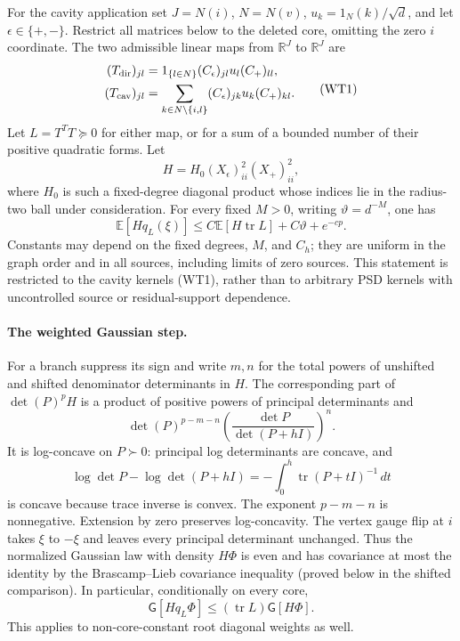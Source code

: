 \documentclass[10pt]{article}
\numberwithin{equation}{section}
\newcommand{\1}{\mathbf1}
\begin{document}
For the cavity application set $J=N(i)$, $N=N(v)$,
$u_k=1_N(k)/\sqrt d$, and let $\epsilon\in\{+,-\}$.  Restrict all
matrices below to the deleted core, omitting the zero $i$ coordinate.
The two admissible linear maps from $\mathbb R^J$ to $\mathbb R^J$ are
\[
 \begin{split}
 (T_{\rm dir})_{jl}
   &=1_{\{l\in N\}}(C_\epsilon)_{jl}u_l(C_+)_{ll},\\
 (T_{\rm cav})_{jl}
   &=\sum_{k\in N\setminus\{i,l\}}
               (C_\epsilon)_{jk}u_k(C_+)_{kl}.
 \end{split}                                                    \tag{WT1}
\]
Let $L=T^TT\succeq0$ for either map, or for a sum of a bounded number
of their positive quadratic forms.  Let
\[
 H=H_0(X_\epsilon)_{ii}^2(X_+)_{ii}^2,
\]
where $H_0$ is such a fixed-degree diagonal product whose indices
lie in the radius-two ball under consideration.
For every fixed $M>0$, writing $\vartheta=d^{-M}$, one has
\[
 \boxed{\quad
 \mathbb E[Hq_L(\xi)]\le C\mathbb E[H\operatorname{tr}L]
                                  +C\vartheta+e^{-cp}.
 \quad}                                                         \tag{WT2}
\]
Constants may depend on the fixed degrees, $M$, and $C_h$; they are
uniform in the graph order and in all sources, including limits of
zero sources.  This statement is restricted to the cavity kernels
(WT1), rather than to arbitrary PSD kernels with uncontrolled source
or residual-support dependence.

\paragraph{The weighted Gaussian step.}
For a branch suppress its sign and write $m,n$ for the total powers
of unshifted and shifted denominator determinants in $H$.  The
corresponding part of $\det(P)^pH$ is a product of positive powers of
principal determinants and
\[
 \det(P)^{p-m-n}
            \left(\frac{\det P}{\det(P+hI)}\right)^n.
\]
It is log-concave on $P\succ0$: principal log determinants are
concave, and
\[
 \log\det P-\log\det(P+hI)
       =-\int_0^h\operatorname{tr}(P+tI)^{-1}\,dt
\]
is concave because trace inverse is convex.  The exponent $p-m-n$
is nonnegative.  Extension by zero preserves log-concavity.  The
vertex gauge flip at $i$ takes $\xi$ to $-\xi$ and leaves every
principal determinant unchanged.  Thus the normalized Gaussian law
with density $H\Phi$ is even and has covariance at most the identity
by the Brascamp--Lieb covariance inequality (proved below in the
shifted comparison).  In particular, conditionally on every core,
\[
 \mathsf G[Hq_L\Phi]\le
                   (\operatorname{tr}L)\mathsf G[H\Phi].          \tag{WT3}
\]
This applies to non-core-constant root diagonal weights as well.
\end{document}
